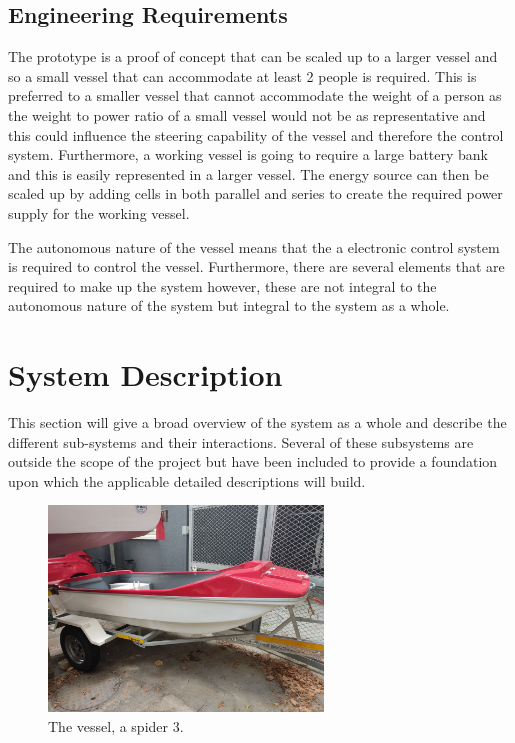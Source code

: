 	\subsection{Engineering Requirements}
	The prototype is a proof of concept that can be scaled up to a larger vessel and so a small vessel that can accommodate at least 2 people is required. This is preferred to a smaller vessel that cannot accommodate the weight of a person as the weight to power ratio of a small vessel would not be as representative and this could influence the steering capability of the vessel and therefore the control system.
	Furthermore, a working vessel is going to require a large battery bank and this is easily represented in a larger vessel. The energy source can then be scaled up by adding cells in both parallel and series to create the required power supply for the working vessel.\par
	The autonomous nature of the vessel means that the a electronic control system is required to control the vessel. Furthermore, there are several elements that are required to make up the system however, these are not integral to the autonomous nature of the system but integral to the system as a whole. %
\section{System Description}
This section will give a broad overview of the system as a whole and describe the different sub-systems and their interactions. Several of these subsystems are outside the scope of the project but have been included to provide a foundation upon which the applicable detailed descriptions will build. \par
\begin{figure}
	\begin{center}
		\includegraphics[width = 0.65\textwidth]{figures/spider3.jpg}
		\caption{The vessel, a spider 3.}
		\label{fig:3:spider}
	\end{center}
\end{figure}
